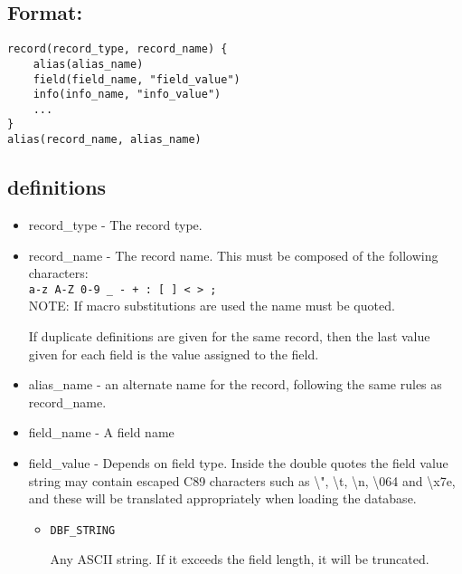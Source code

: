 \subsection{Format:}

\begin{verbatim}
record(record_type, record_name) {
    alias(alias_name)
    field(field_name, "field_value")
    info(info_name, "info_value")
    ...
}
alias(record_name, alias_name)
\end{verbatim}
\subsection{definitions}
\begin{itemize}\item {}record\_type - The record type. 

\item {}record\_name - The record name. This must be composed of the following characters:\\
\verb|a-z A-Z 0-9 _ - + : [ ] < > ;|\\
NOTE: If macro substitutions are used the name must be quoted.

If duplicate definitions are given for the same record, then the last value given for each field is the value assigned 
to the field. 

\item {}alias\_name - an alternate name for the record, following the same rules as record\_name.

\item {}field\_name - A field name

\item {}field\_value - Depends on field type. Inside the double quotes the field value string may contain escaped C89 
characters such as \textbackslash{}", \textbackslash{}t, \textbackslash{}n, \textbackslash{}064 and \textbackslash{}x7e, and these will be translated appropriately when loading the database.

\begin{itemize}

\item \verb|DBF_STRING|

Any ASCII string. If it exceeds the field length, it will be truncated.


\end{itemize}
\end{itemize}
